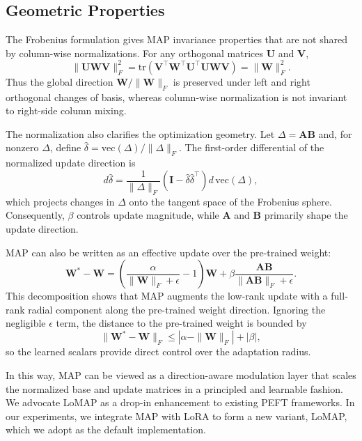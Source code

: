 \subsection{Geometric Properties}

The Frobenius formulation gives MAP invariance properties that are not shared by column-wise normalizations.
For any orthogonal matrices $\mathbf{U}$ and $\mathbf{V}$,
\begin{equation}
\|\mathbf{U}\mathbf{W}\mathbf{V}\|_F^2
=\mathrm{tr}(\mathbf{V}^{\top}\mathbf{W}^{\top}\mathbf{U}^{\top}\mathbf{U}\mathbf{W}\mathbf{V})
=\|\mathbf{W}\|_F^2.
\end{equation}
Thus the global direction $\mathbf{W}/\|\mathbf{W}\|_F$ is preserved under left and right orthogonal changes of basis, whereas column-wise normalization is not invariant to right-side column mixing.

The normalization also clarifies the optimization geometry.
Let $\Delta=\mathbf{A}\mathbf{B}$ and, for nonzero $\Delta$, define $\hat{\delta}=\mathrm{vec}(\Delta)/\|\Delta\|_F$.
The first-order differential of the normalized update direction is
\begin{equation}
d\hat{\delta}=
\frac{1}{\|\Delta\|_F}
\left(\mathbf{I}-\hat{\delta}\hat{\delta}^{\top}\right)d\,\mathrm{vec}(\Delta),
\end{equation}
which projects changes in $\Delta$ onto the tangent space of the Frobenius sphere.
Consequently, $\beta$ controls update magnitude, while $\mathbf{A}$ and $\mathbf{B}$ primarily shape the update direction.

MAP can also be written as an effective update over the pre-trained weight:
\begin{equation}
\mathbf{W}^*-\mathbf{W}
=
\left(\frac{\alpha}{\|\mathbf{W}\|_F+\epsilon}-1\right)\mathbf{W}
+
\beta\frac{\mathbf{A}\mathbf{B}}{\|\mathbf{A}\mathbf{B}\|_F+\epsilon}.
\end{equation}
This decomposition shows that MAP augments the low-rank update with a full-rank radial component along the pre-trained weight direction.
Ignoring the negligible $\epsilon$ term, the distance to the pre-trained weight is bounded by
\begin{equation}
\|\mathbf{W}^*-\mathbf{W}\|_F
\leq
|\alpha-\|\mathbf{W}\|_F|+|\beta|,
\end{equation}
so the learned scalars provide direct control over the adaptation radius.




In this way, MAP can be viewed as a direction-aware modulation layer that scales the normalized base and update matrices in a principled and learnable fashion.
We advocate LoMAP as a drop-in enhancement to existing PEFT frameworks.
In our experiments, we integrate MAP with LoRA to form a new variant, LoMAP, which we adopt as the default implementation.
